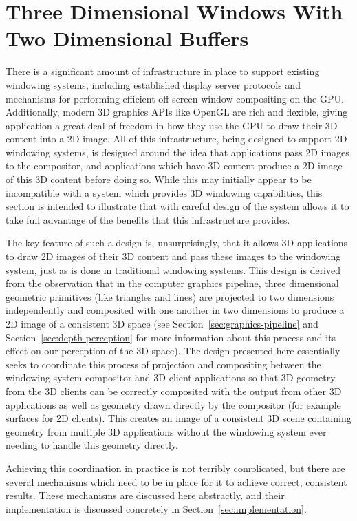 \section{Three Dimensional Windows With Two Dimensional Buffers}
There is a significant amount of infrastructure in place to support existing windowing systems, including established display server protocols and mechanisms for performing efficient off-screen window compositing on the GPU. Additionally, modern 3D graphics APIs like OpenGL are rich and flexible, giving application a great deal of freedom in how they use the GPU to draw their 3D content into a 2D image. All of this infrastructure, being designed to support 2D windowing systems, is designed around the idea that applications pass 2D images to the compositor, and applications which have 3D content produce a 2D image of this 3D content before doing so. While this may initially appear to be incompatible with a system which provides 3D windowing capabilities, this section is intended to illustrate that with careful design of the system allows it to take full advantage of the benefits that this infrastructure provides.

The key feature of such a design is, unsurprisingly, that it allows 3D applications to draw 2D images of their 3D content and pass these images to the windowing system, just as is done in traditional windowing systems. This design is derived from the observation that in the computer graphics pipeline, three dimensional geometric primitives (like triangles and lines) are projected to two dimensions independently and composited with one another in two dimensions to produce a 2D image of a consistent 3D space (see Section~\ref{sec:graphics-pipeline} and Section~\ref{sec:depth-perception} for more information about this process and its effect on our perception of the 3D space). The design presented here essentially seeks to coordinate this process of projection and compositing between the windowing system compositor and 3D client applications so that 3D geometry from the 3D clients can be correctly composited with the output from other 3D applications as well as geometry drawn directly by the compositor (for example surfaces for 2D clients). This creates an image of a consistent 3D scene containing geometry from multiple 3D applications without the windowing system ever needing to handle this geometry directly.

Achieving this coordination in practice is not terribly complicated, but there are several mechanisms which need to be in place for it to achieve correct, consistent results. These mechanisms are discussed here abstractly, and their implementation is discussed concretely in Section~\ref{sec:implementation}.

